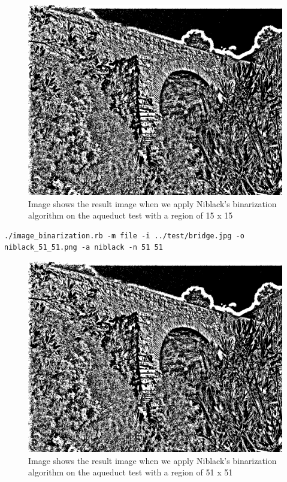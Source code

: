 \documentclass[a4paper,10pt,titlepage]{article}
\begin{document}
\par \begin{figure}[H]
	\centerline{%
	\includegraphics[scale=0.3]{./images/niblack_15_15.png}
	}
	\caption[Niblack's binarization sample 15 x 15 ]{Image shows the result image when we apply Niblack's binarization algorithm on the aqueduct test with a region of 15 x 15}
\end{figure}

{\footnotesize\begin{verbatim}
./image_binarization.rb -m file -i ../test/bridge.jpg -o niblack_51_51.png -a niblack -n 51 51
\end{verbatim}}

\par \begin{figure}[H]
	\centerline{%
	\includegraphics[scale=0.3]{./images/niblack_51_51.png}
	}
	\caption[Niblack's binarization sample 51 x 51 ]{Image shows the result image when we apply Niblack's binarization algorithm on the aqueduct test with a region of 51 x 51}
\end{figure}
\end{document}
